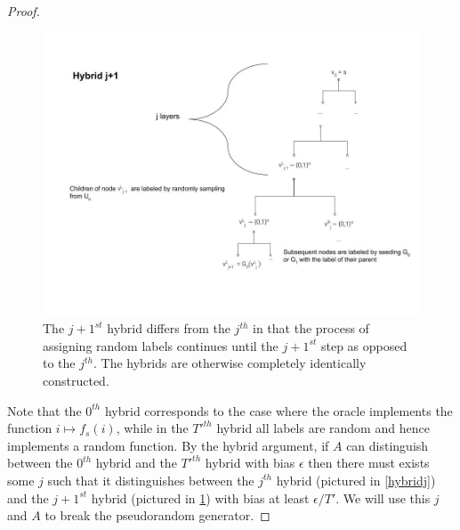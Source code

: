 \begin{proof}
\begin{figure}
\centering
\includegraphics[width=\textwidth, height=0.25\paperheight, keepaspectratio]{../figure/hybrid_j1_thm_5-1.jpg}
\caption{The \(j+1^{st}\) hybrid differs from the \(j^{th}\) in that the
process of assigning random labels continues until the \(j+1^{st}\) step
as opposed to the \(j^{th}\). The hybrids are otherwise completely
identically constructed.}
\label{hybridj1}
\end{figure}

Note that the \(0^{th}\) hybrid corresponds to the case where the oracle
implements the function \(i\mapsto f_s(i)\), while in the \(T'^{th}\)
hybrid all labels are random and hence implements a random function. By
the hybrid argument, if \(A\) can distinguish between the \(0^{th}\)
hybrid and the \(T'^{th}\) hybrid with bias \(\epsilon\) then there must
exists some \(j\) such that it distinguishes between the \(j^{th}\)
hybrid (pictured in \cref{hybridj}) and the \(j+1^{st}\) hybrid
(pictured in \cref{hybridj1}) with bias at least \(\epsilon/T'\). We
will use this \(j\) and \(A\) to break the pseudorandom generator.


\end{proof}
